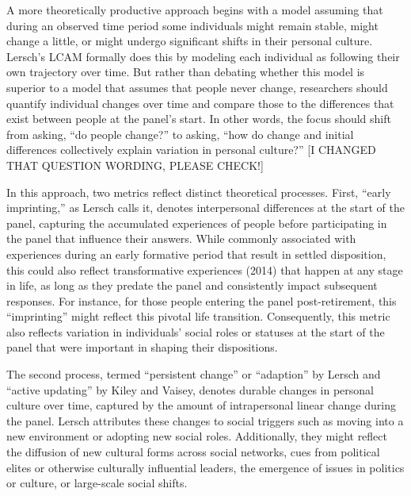 \documentclass[
  11pt,
]{article}
\begin{document}
A more theoretically productive approach begins with a model assuming
that during an observed time period some individuals might remain
stable, might change a little, or might undergo significant shifts in
their personal culture. Lersch's LCAM formally does this by modeling
each individual as following their own trajectory over time. But rather
than debating whether this model is superior to a model that assumes
that people never change, researchers should quantify individual changes
over time and compare those to the differences that exist between people
at the panel's start. In other words, the focus should shift from
asking, ``do people change?'' to asking, ``how do change and initial
differences collectively explain variation in personal culture?'' {[}I
CHANGED THAT QUESTION WORDING, PLEASE CHECK!{]}

In this approach, two metrics reflect distinct theoretical processes.
First, ``early imprinting,'' as Lersch calls it, denotes interpersonal
differences at the start of the panel, capturing the accumulated
experiences of people before participating in the panel that influence
their answers. While commonly associated with experiences during an
early formative period that result in settled disposition, this could
also reflect transformative experiences (2014) that happen at any stage
in life, as long as they predate the panel and consistently impact
subsequent responses. For instance, for those people entering the panel
post-retirement, this ``imprinting'' might reflect this pivotal life
transition. Consequently, this metric also reflects variation in
individuals' social roles or statuses at the start of the panel that
were important in shaping their dispositions.

The second process, termed ``persistent change'' or ``adaption'' by
Lersch and ``active updating'' by Kiley and Vaisey, denotes durable
changes in personal culture over time, captured by the amount of
intrapersonal linear change during the panel. Lersch attributes these
changes to social triggers such as moving into a new environment or
adopting new social roles. Additionally, they might reflect the
diffusion of new cultural forms across social networks, cues from
political elites or otherwise culturally influential leaders, the
emergence of issues in politics or culture, or large-scale social
shifts.
\end{document}
